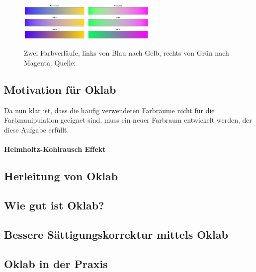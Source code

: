 \documentclass[12pt, a4paper, ngerman]{article}
\begin{document}
\begin{figure}
  \centering
  \includegraphics[width=0.29\textwidth]{Grafiken/Farbverlauf/blueyellow.png}
  \includegraphics[width=0.29\textwidth]{Grafiken/Farbverlauf/greenmagenta.png}
  \caption{Zwei Farbverläufe, links von Blau nach Gelb, rechts von Grün nach Magenta. Quelle: ~\cite{Ottosson_2020}}
  \label{fig:vergleich_zweifarbig}
\end{figure}

\subsection{Motivation für Oklab}
Da nun klar ist, dass die häufig verwendeten Farbräume nicht für die Farbmanipulation geeignet sind, 
muss ein neuer Farbraum entwickelt werden, der diese Aufgabe erfüllt.

\paragraph{Helmholtz-Kohlrausch Effekt}


\subsection{Herleitung von Oklab}
\subsection{Wie gut ist Oklab?}
\subsection{Bessere Sättigungskorrektur mittels Oklab}
\subsection{Oklab in der Praxis}

\newpage
\printbibliography
\end{document}
